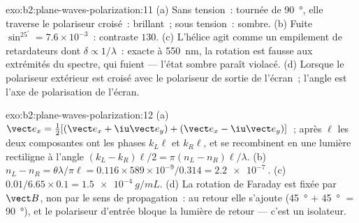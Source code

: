 \begin{solution}{exo:b2:plane-waves-polarization:11}
(a) Sans tension~: tournée de \qty{90}{\degree}, elle traverse le polariseur croisé~:
brillant~; sous tension~: sombre. (b) Fuite $\sin^25^\circ = 7.6 \times 10^{-3}$~: contraste
$130$. (c) L'hélice agit comme un empilement de retardateurs dont $\delta \propto 1/\lambda$~:
exacte à \qty{550}{nm}, la rotation est fausse aux extrémités du spectre,
qui fuient --- l'état sombre paraît violacé. (d) Lorsque le polariseur
extérieur est croisé avec le polariseur de sortie de l'écran~; l'angle est
l'axe de polarisation de l'écran.
\end{solution}

\begin{solution}{exo:b2:plane-waves-polarization:12}
(a) $\vect e_x = \tfrac12[(\vect e_x + \iu\vect e_y) + (\vect e_x - \iu\vect e_y)]$~; après $\ell$
les deux composantes ont les phases $k_L\ell$ et $k_R\ell$, et se recombinent en une
lumière rectiligne à l'angle $(k_L - k_R)\ell/2 = \pi(n_L - n_R)\ell/\lambda$. (b) $n_L -
n_R = \theta\lambda/\pi\ell = 0.116 \times 589 \times 10^{-9}/0.314 = \qty{2.2e-7}{}$. (c)
$0.01/6.65 \times 0.1 = \qty{1.5e-4}{g/mL}$. (d) La rotation de Faraday est fixée par
$\vect B$, non par le sens de propagation~: au retour elle s'ajoute
(\qty{45}{\degree} $+$ \qty{45}{\degree} $=$ \qty{90}{\degree}), et le polariseur d'entrée bloque
la lumière de retour --- c'est un isolateur.
\end{solution}

